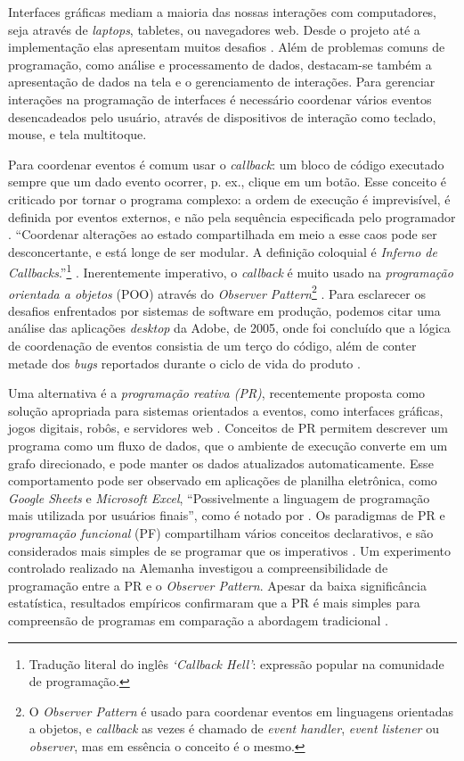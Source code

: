 Interfaces gráficas mediam a maioria das nossas interações com computadores,
seja através de \emph{laptops}, tabletes, ou navegadores web.
Desde o projeto até a implementação elas apresentam muitos desafios
\cite{myers1994}.
Além de problemas comuns de programação, como análise e processamento de dados,
destacam-se também a apresentação de dados na tela e o gerenciamento de
interações.
Para gerenciar interações na programação de interfaces é necessário coordenar
vários eventos desencadeados pelo usuário, através de dispositivos de interação
como teclado, mouse, e tela multitoque.

Para coordenar eventos é comum usar o \emph{callback}: um bloco de código executado
sempre que um dado evento ocorrer, p. ex., clique em um botão.
Esse conceito é criticado por tornar o programa complexo: a ordem de execução é
imprevisível, é definida por eventos externos, e não pela sequência especificada
pelo programador \cite{maier2010,edwards2009,fischer2007}.
“Coordenar alterações ao estado compartilhada em meio a esse caos pode ser
desconcertante, e está longe de ser modular. A definição coloquial é \emph{Inferno de
Callbacks}.”\footnote{Tradução literal do inglês \emph{‘Callback Hell’}: expressão
popular na comunidade de programação.} \cite[p. 2; tradução nossa]{edwards2009}.
Inerentemente imperativo, o \emph{callback} é muito usado na \emph{programação orientada a
objetos} (POO) através do \emph{Observer Pattern}\footnote{O \emph{Observer Pattern} é usado para coordenar eventos em
linguagens orientadas a objetos, e \emph{callback} as vezes é chamado de \emph{event
handler}, \emph{event listener} ou \emph{observer}, mas em essência o conceito é o mesmo.}
\cite{blackheath2016,maier2010}.
Para esclarecer os desafios enfrentados por sistemas de software em produção,
podemos citar uma análise das aplicações \emph{desktop} da Adobe, de 2005, onde foi
concluído que a lógica de coordenação de eventos consistia de um terço do
código, além de conter metade dos \emph{bugs} reportados durante o ciclo de vida do
produto \cite{jarvi2008}.

Uma alternativa é a \emph{programação reativa (PR)}, recentemente proposta como
solução apropriada para sistemas orientados a eventos, como interfaces gráficas,
jogos digitais, robôs, e servidores web \cite{salvaneschi2015,bainomugisha2013}.
Conceitos de PR permitem descrever um programa como um fluxo de dados, que o
ambiente de execução converte em um grafo direcionado, e pode manter os dados
atualizados automaticamente.
Esse comportamento pode ser observado em aplicações de planilha eletrônica, como
\emph{Google Sheets} e \emph{Microsoft Excel}, “Possivelmente a linguagem de programação
mais utilizada por usuários finais”, como é notado por
\textcite[p. 2]{bainomugisha2013}.
Os paradigmas de PR e \emph{programação funcional} (PF) compartilham vários conceitos
declarativos, e são considerados mais simples de se programar que os imperativos
\cite{blackheath2016,bainomugisha2013}.
Um experimento controlado realizado na Alemanha investigou a compreensibilidade
de programação entre a PR e o \emph{Observer Pattern}.
Apesar da baixa significância estatística, resultados empíricos confirmaram que
a PR é mais simples para compreensão de programas em comparação a abordagem
tradicional \cite{salvaneschi2014}.

